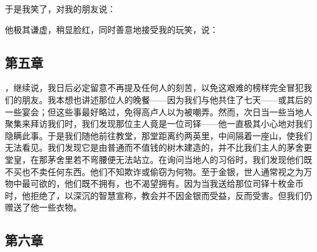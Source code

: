 于是我笑了，对我的朋友说：\par

他极其谦虚，稍显脸红，同时善意地接受我的玩笑，说：\par


\subsection{第五章}

，继续说，我日后必定留意不再提及任何人的刻苦，以免这艰难的榜样完全冒犯我们的朋友。我本想也讲述那位人的晚餐——因为我们与他共住了七天——或其后的一些宴会；但这些事最好略过，免得高卢人以为被嘲弄。然而，次日当一些当地人聚集来拜访我们时，我们发现那位主人竟是一位司铎——他一直极其小心地对我们隐瞒此事。于是我们随他前往教堂，那堂距离约两英里，中间隔着一座山，使我们无法看见。我们发现它是由普通而不值钱的树木建造的，并不比我们主人的茅舍更堂皇，在那茅舍里若不弯腰便无法站立。在询问当地人的习俗时，我们发现他们既不买也不卖任何东西。他们不知欺诈或偷窃为何物。至于金银，世人通常视之为万物中最可欲的，他们既不拥有，也不渴望拥有。因为当我送给那位司铎十枚金币时，他拒绝了，以深沉的智慧宣称，教会并不因金银而受益，反而受害。但我们仍赠送了他一些衣物。\newline{}\par


\subsection{第六章}


